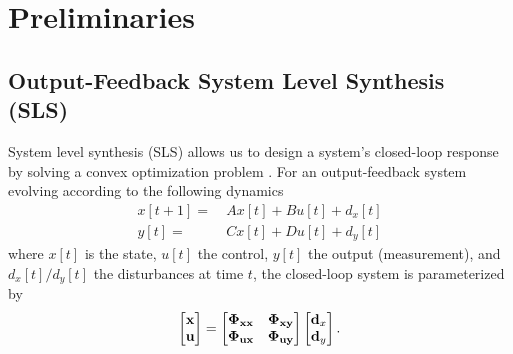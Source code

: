\section{Preliminaries}\label{sec:preliminaries}  %

\subsection{Output-Feedback System Level Synthesis (SLS)}

System level synthesis (SLS) allows us to design a system's closed-loop response by solving a convex optimization problem \cite{wang2019system,anderson2019system}. For an output-feedback system evolving according to the following dynamics
\begin{align*}
x[t+1] =&\ A x[t] + B u[t] + d_x[t] \\
y[t] =&\ C x[t] + D u[t] + d_y[t]
\end{align*}
where $x[t]$ is the state, $u[t]$ the control, $y[t]$ the output (measurement), and $d_x[t]/d_y[t]$ the disturbances at time $t$, the closed-loop system is parameterized by
\begin{align*}
    \begin{bmatrix}
        {\bf x} \\ {\bf u}
    \end{bmatrix} = 
    \begin{bmatrix}
        \bm{\Phi}_{{\bf x}{\bf x}} & \bm{\Phi}_{{\bf x}{\bf y}} \\ \bm{\Phi}_{{\bf u}{\bf x}} & \bm{\Phi}_{{\bf u}{\bf y}}
    \end{bmatrix} 
    \begin{bmatrix}
        {\bf d}_x \\ {\bf d}_y
    \end{bmatrix}.
\end{align*}

